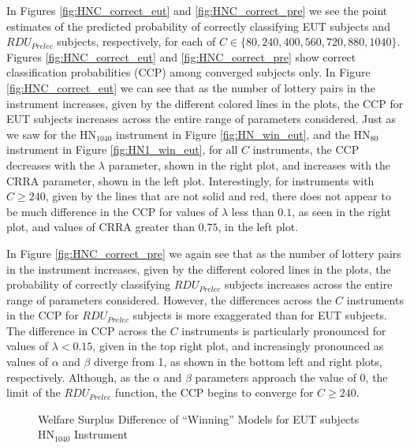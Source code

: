 \documentclass[../main.tex]{subfiles}
\begin{document}
In Figures \ref{fig:HNC_correct_eut} and \ref{fig:HNC_correct_pre} we see the point estimates of the predicted probability of correctly classifying EUT subjects and $\mathit{RDU_{Prelec}}$ subjects, respectively, for each of $C \in \lbrace 80, 240, 400, 560, 720, 880, 1040 \rbrace$.
Figures \ref{fig:HNC_correct_eut} and \ref{fig:HNC_correct_pre} show correct classification probabilities (CCP) among converged subjects only.
In Figure \ref{fig:HNC_correct_eut} we can see that as the number of lottery pairs in the instrument increases, given by the different colored lines in the plots, the CCP for EUT subjects increases across the entire range of parameters considered.
Just as we saw for the $\text{HN}_{1040}$ instrument in Figure \ref{fig:HN_win_eut}, and the $\text{HN}_{80}$ instrument in Figure \ref{fig:HN1_win_eut}, for all $C$ instruments, the CCP decreases with the $\lambda$ parameter, shown in the right plot, and increases with the CRRA parameter, shown in the left plot.
Interestingly, for instruments with $C \geq 240$, given by the lines that are not solid and red, there does not appear to be much difference in the CCP for values of $\lambda$ less than $0.1$, as seen in the right plot, and values of CRRA greater than $0.75$, in the left plot.

In Figure \ref{fig:HNC_correct_pre} we again see that as the number of lottery pairs in the instrument increases, given by the different colored lines in the plots, the probability of correctly classifying $\mathit{RDU_{Prelec}}$ subjects increases across the entire range of parameters considered.
However, the differences across the $C$ instruments in the CCP for $\mathit{RDU_{Prelec}}$ subjects is more exaggerated than for EUT subjects.
The difference in CCP across the $C$ instruments is particularly pronounced for values of $\lambda < 0.15$, given in the top right plot, and increasingly pronounced as values of $\alpha$ and $\beta$ diverge from 1, as shown in the bottom left and right plots, respectively.
Although, as the $\alpha$ and $\beta$ parameters approach the value of 0, the limit of the $\mathit{RDU_{Prelec}}$ function, the CCP begins to converge for $C \geq 240$.

\begin{figure}[h!]
	\center
	\caption{Welfare Surplus Difference of \enquote{Winning} Models for EUT subjects\\$\text{HN}_{1040}$ Instrument}
	\label{fig:HN_wel_eut}
\end{figure}
\end{document}
